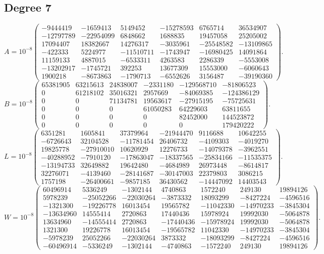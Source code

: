 \documentclass[11pt]{article}
\begin{document}
\subsection*{Degree 7}
\[
 A=10^{-8}\left(\begin{array}{rrrrrr}
-9444419&-1659413&5149452&-15278593&6765714&36534907\\
-12797789&-22954099&6848662&1688835&19457058&25205002\\
17094407&18382667&14276317&-3035961&-25548582&-13109865\\
-422333&5224977&-11510711&-1743947&-16980425&14091864\\
11159133&4887015&-6533311&4263583&2286339&-5553008\\
-13202917&-1745721&392253&13677309&15553000&-6060643\\
1900218&-8673863&-1790713&-6552626&3156487&-39190360
\end{array}\right).
\]
\[
 B=10^{-8}\left(\begin{array}{rrrrrr}
65381905&63215613&24838007&-2331180&-129568710&-81806523\\
0&61218102&35016321&2957669&-84069385&-124386129\\
0&0&71134781&19563617&-27915195&-75725631\\
0&0&0&61050283&64229603&63811655\\
0&0&0&0&82452000&144523872\\
0&0&0&0&0&179420222
\end{array}\right).
\]
\[
 L=10^{-8}\left(\begin{array}{rrrrrr}
6351281&1605841&37379964&-21944470&9116688&10642255\\
-6726643&32104528&-11781454&26406732&-4109303&-4019270\\
19825778&-27910010&10620929&12276733&-14079378&-3962551\\
-40288952&-7910120&-17863047&-18337565&-25834166&-11535375\\
-13194733&32649882&19642480&-4684989&26973448&-8614817\\
32276071&-4139460&-28141687&-30147003&22379803&3086215\\
1757198&-26400661&-9857185&36430562&-14447092&14403543
\end{array}\right).
\]
\[
 W=10^{-8}\left(\begin{array}{rrrrrrr}
60496914&5336249&-1302144&4740863&1572240&249130&19894126\\
5978239&-25052266&-22030264&-3873332&18093299&-8427224&-4596516\\
-1321300&-19226778&16013454&19565782&-11042330&-14970233&-3845304\\
-13634960&14555414&2720863&17440436&15978924&19992030&-5064878\\
13634960&-14555414&2720863&-17440436&-15978924&19992030&-5064878\\
1321300&19226778&16013454&-19565782&11042330&-14970233&-3845304\\
-5978239&25052266&-22030264&3873332&-18093299&-8427224&-4596516\\
-60496914&-5336249&-1302144&-4740863&-1572240&249130&19894126
\end{array}\right).
\]
\endgroup
\end{document}
